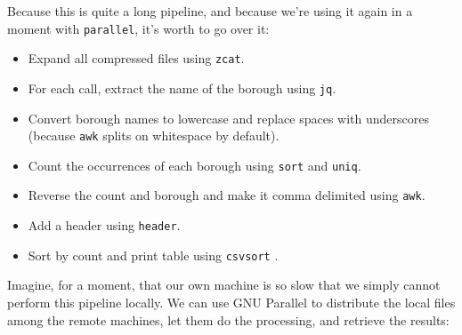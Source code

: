 \documentclass[
]{book}
\theoremstyle{definition}
\theoremstyle{definition}
\theoremstyle{definition}
\theoremstyle{remark}
\begin{document}
Because this is quite a long pipeline, and because we're using it again in a moment with \texttt{parallel}, it's worth to go over it:

\begin{itemize}
\item
  Expand all compressed files using \texttt{zcat}.
\item
  For each call, extract the name of the borough using \texttt{jq}.
\item
  Convert borough names to lowercase and replace spaces with underscores (because \texttt{awk} splits on whitespace by default).
\item
  Count the occurrences of each borough using \texttt{sort} and \texttt{uniq}.
\item
  Reverse the count and borough and make it comma delimited using \texttt{awk}.
\item
  Add a header using \texttt{header}.
\item
  Sort by count and print table using \texttt{csvsort} \citep{csvsort}.
\end{itemize}

Imagine, for a moment, that our own machine is so slow that we simply cannot perform this pipeline locally. We can use GNU Parallel to distribute the local files among the remote machines, let them do the processing, and retrieve the results:
\end{document}
